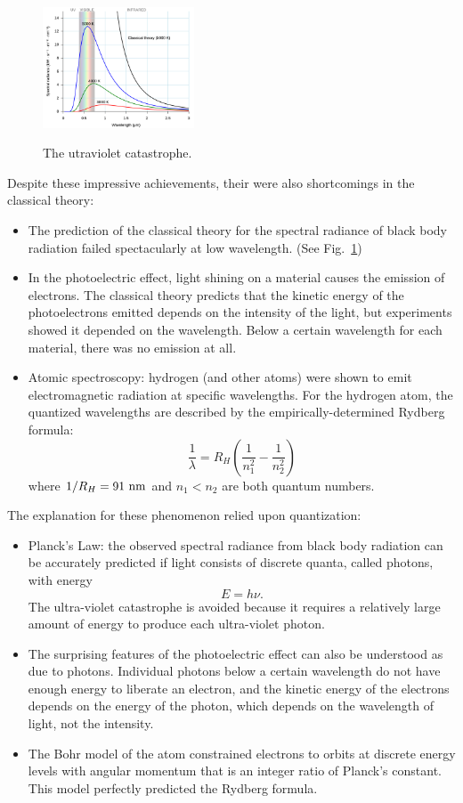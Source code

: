 \documentclass[12pt]{book}
\begin{document}
\begin{figure}[thb]
\begin{center}
{\includegraphics[width=0.40\textwidth]{figs/black_body.png}}
\end{center}
\caption{\label{fig:blackbody} The utraviolet catastrophe.}
\end{figure}


\noindent
Despite these impressive achievements, their were also shortcomings in the classical theory:
\begin{itemize}
\item The prediction of the classical theory for the spectral radiance of black body radiation failed spectacularly at low wavelength.  (See Fig.~\ref{fig:blackbody})
\item In the photoelectric effect, light shining on a material causes the emission of electrons.  The classical theory predicts that the kinetic energy of the photoelectrons emitted depends on the intensity of the light, but experiments showed it depended on the wavelength.  Below a certain wavelength for each material, there was no emission at all.
\item Atomic spectroscopy: hydrogen (and other atoms) were shown to emit electromagnetic radiation at specific wavelengths.  For the hydrogen atom, the quantized wavelengths are described by the empirically-determined Rydberg formula:
\begin{displaymath}
\frac{1}{\lambda} = R_H \left( \frac{1}{n_1^2} - \frac{1}{n_2^2} \right)
\end{displaymath}
where $1/R_H = 91~\rm nm$ and $n_1 < n_2$ are both quantum numbers.
\end{itemize}
The explanation for these phenomenon relied upon quantization: 
\begin{itemize}
\item Planck's Law: the observed spectral radiance from black body radiation can be accurately predicted if light consists of discrete quanta, called photons, with energy 
$$E = h \nu.$$  
The ultra-violet catastrophe is avoided because it requires a relatively large amount of energy to produce each ultra-violet photon.   
\item The surprising features of the photoelectric effect can also be understood as due to photons.  Individual photons below a certain wavelength do not have enough energy to liberate an electron, and the kinetic energy of the electrons depends on the energy of the photon, which depends on the wavelength of light, not the intensity. 
\item The Bohr model of the atom constrained electrons to orbits at discrete energy levels with angular momentum that is an integer ratio of Planck's constant.  This model perfectly predicted the Rydberg formula.
\end{itemize}
\end{document}
